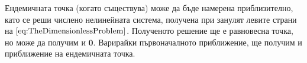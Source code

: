 
Ендемичната точка (когато съществува) може да бъде намерена приблизително, като се реши числено нелинейната система, получена при занулят левите страни на $\eqref{eq:TheDimensionlessProblem}$.
Полученото решение ще е равновесна точка, но може да получим и $\mathbf{0}$.
Варирайки първоначалното приближение, ще получим и приближение на ендемичната точка.
